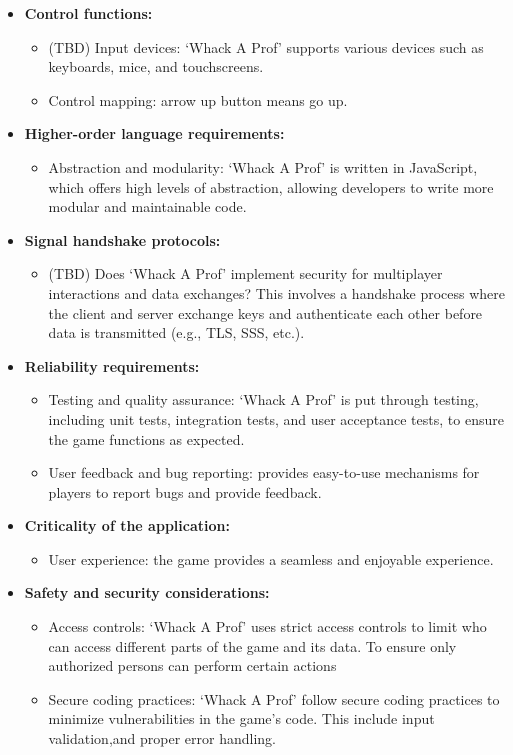 \documentclass{article}
\begin{document}
\begin{itemize}
\begin{itemize}
    \end{itemize}
    \item \textbf{Control functions:}
    \begin{itemize}
        \item (TBD) Input devices: ‘Whack A Prof’ supports various devices such as keyboards, mice, and touchscreens.
        \item Control mapping: arrow up button means go up.
    \end{itemize}
    \item \textbf{Higher-order language requirements:}
    \begin{itemize}
        \item Abstraction and modularity: ‘Whack A Prof’ is written in JavaScript, which offers high levels of abstraction, allowing developers to write more modular and maintainable code.
    \end{itemize}
    \item \textbf{Signal handshake protocols:}
    \begin{itemize}
        \item (TBD) Does ‘Whack A Prof’ implement security for multiplayer interactions and data exchanges? This involves a handshake process where the client and server exchange keys and authenticate each other before data is transmitted (e.g., TLS, SSS, etc.).
    \end{itemize}
    \item \textbf{Reliability requirements:}
    \begin{itemize}
        \item Testing and quality assurance: ‘Whack A Prof’ is put through testing, including unit tests, integration tests, and user acceptance tests, to ensure the game functions as expected.
        \item User feedback and bug reporting: provides easy-to-use mechanisms for players to report bugs and provide feedback.
    \end{itemize}
    \item \textbf{Criticality of the application:}
    \begin{itemize}
        \item User experience: the game provides a seamless and enjoyable experience.
    \end{itemize}
    \item \textbf{Safety and security considerations:}
    \begin{itemize}
        \item Access controls: ‘Whack A Prof’ uses strict access controls to limit who can access different parts of the game and its data. To ensure only authorized persons can perform certain actions
        \item Secure coding practices: ‘Whack A Prof’ follow secure coding practices to minimize vulnerabilities in the game’s code. This include input validation,and proper error handling.

    \end{itemize}
    
\end{itemize}
\end{document}

